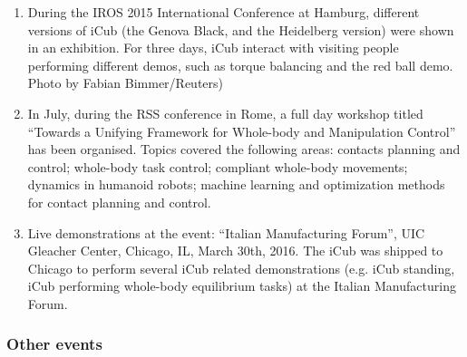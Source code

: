 \begin{enumerate}
\item During the IROS 2015 International Conference at Hamburg, different versions of iCub (the Genova Black, and the Heidelberg version) were shown in an exhibition. For three days, iCub interact with visiting people performing different demos, such as torque balancing and the red ball demo. Photo by Fabian Bimmer/Reuters)

\item In July, during the RSS conference in Rome, a full day workshop titled ``Towards a Unifying Framework for Whole-body and Manipulation Control'' has been organised. Topics covered the following areas: contacts planning and control; whole-body task control; compliant whole-body movements; dynamics in humanoid robots; machine learning and optimization methods for contact planning and control.

\item Live demonstrations at the event: ``Italian Manufacturing Forum'', UIC Gleacher Center, Chicago, IL, March 30th, 2016. The iCub was shipped to Chicago to perform several iCub related demonstrations (e.g. iCub standing, iCub performing whole-body equilibrium tasks) at the Italian Manufacturing Forum. 
\end{enumerate}

\subsubsection{Other events}

